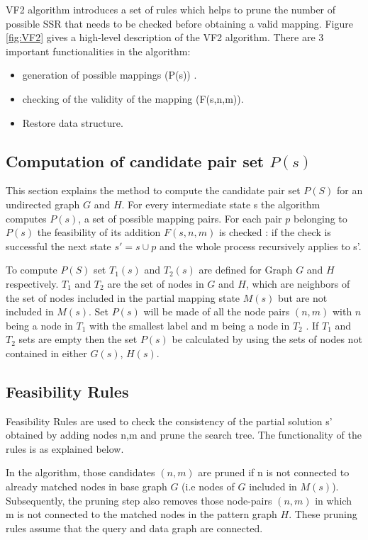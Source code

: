 VF2 algorithm introduces a set of rules which helps to prune the number of possible SSR that needs to be checked before obtaining a valid mapping. Figure \ref{fig:VF2} gives a high-level description of the VF2 algorithm.
There are 3 important functionalities in the algorithm: 
\begin{itemize}
\item generation of possible mappings (P(s)) .
\item checking of the validity of the mapping (F(s,n,m)).
\item Restore data structure.
\end{itemize}



\subsection{Computation of candidate pair set $P(s)$}
This section explains the method to compute the candidate pair set $P(S)$ for an undirected graph $G$ and $H$. 
For every intermediate state s the algorithm computes $P(s)$, a set of possible mapping pairs. For each pair $p$ belonging to $P(s)$ the feasibility of its addition $F(s,n,m)$ is checked : if the check is successful the next state $s' = s \cup p$ and the whole process recursively applies to s'.

To compute $P(S)$ set $T_1(s)$ and $T_2(s)$ are defined for Graph $G$ and $H$ respectively. $T_1$ and $T_2$ are the set of  nodes in $G$ and $H$, which are neighbors of the set of nodes included in the partial mapping state $M(s)$ but are not included in $M(s)$.
Set $P(s)$ will be made of all the node pairs $(n,m)$ with $n$ being a node in $T_1$ with the smallest label  and m being a node in $T_2$ . If  $T_1$ and $T_2$ sets are empty then the set $P(s)$ be calculated by using the sets of nodes not contained in either $G(s)$, $H(s)$.

\subsection{Feasibility Rules}
Feasibility Rules are used to check the consistency of the partial solution s' obtained by adding nodes n,m and prune the search tree. The functionality of the rules is as explained below.

In the algorithm, those candidates $(n,m)$ are pruned if n is not connected to already matched nodes in base graph $G$
(i.e nodes of $G$ included in $M(s)$).
Subsequently, the pruning step also removes those node-pairs $(n,m)$ in which m is not connected to the matched 
nodes in the pattern graph $H$. These pruning rules assume that the query and data graph are connected.\\

